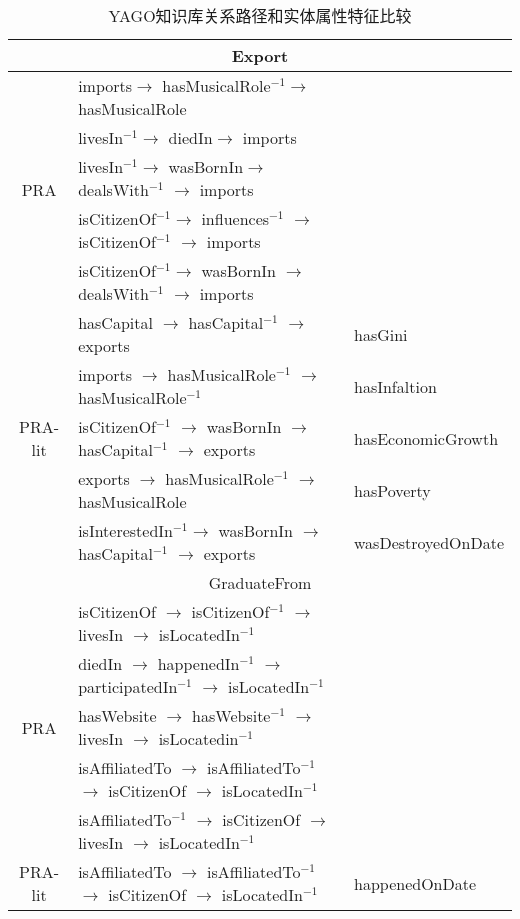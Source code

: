 \begin{table}[htbp]
  \centering
  \caption{YAGO知识库关系路径和实体属性特征比较}
    \begin{tabular}{cp{12.3cm}|p{3.7cm}|}
    \hline
    \multicolumn{3}{c}{Export} \\
    \hline
    \multirow{5}[2]{*}{PRA} & imports$\to$ hasMusicalRole$^{-1}$$\to$ hasMusicalRole &  \\
          & livesIn$^{-1}$$\to$ diedIn$\to$ imports  &  \\
          & livesIn$^{-1}$$\to$ wasBornIn$\to$ dealsWith$^{-1}$ $\to$ imports &  \\
          & isCitizenOf$^{-1}$$\to$ influences$^{-1}$ $\to$ isCitizenOf$^{-1}$ $\to$ imports &  \\
          & isCitizenOf$^{-1}$$\to$ wasBornIn $\to$ dealsWith$^{-1}$ $\to$ imports &  \\
    \hline
    \multirow{5}[2]{*}{PRA-lit} & hasCapital $\to$ hasCapital$^{-1}$ $\to$ exports & hasGini \\
          & imports $\to$ hasMusicalRole$^{-1}$ $\to$ hasMusicalRole$^{-1}$ & hasInfaltion \\
          & isCitizenOf$^{-1}$ $\to$ wasBornIn $\to$ hasCapital$^{-1}$ $\to$ exports & hasEconomicGrowth \\
          & exports $\to$ hasMusicalRole$^{-1}$ $\to$ hasMusicalRole & hasPoverty \\
          & isInterestedIn$^{-1}$$\to$ wasBornIn $\to$ hasCapital$^{-1}$ $\to$ exports& wasDestroyedOnDate \\
    \hline
    \multicolumn{3}{c}{GraduateFrom} \\
    \hline
    \multirow{5}[2]{*}{PRA} & isCitizenOf $\to$ isCitizenOf$^{-1}$ $\to$ livesIn $\to$ isLocatedIn$^{-1}$&  \\
          & diedIn $\to$ happenedIn$^{-1}$ $\to$ participatedIn$^{-1}$ $\to$ isLocatedIn$^{-1}$ &  \\
          & hasWebsite $\to$ hasWebsite$^{-1}$ $\to$ livesIn $\to$ isLocatedin$^{-1}$ &  \\
          & isAffiliatedTo $\to$ isAffiliatedTo$^{-1}$ $\to$ isCitizenOf $\to$ isLocatedIn$^{-1}$ &  \\
          & isAffiliatedTo$^{-1}$ $\to$ isCitizenOf $\to$ livesIn $\to$ isLocatedIn$^{-1}$ &  \\
    \hline
    \multirow{5}[2]{*}{PRA-lit} & isAffiliatedTo $\to$ isAffiliatedTo$^{-1}$ $\to$ isCitizenOf $\to$ isLocatedIn$^{-1}$& happenedOnDate\\

\end{tabular}
\end{table}
